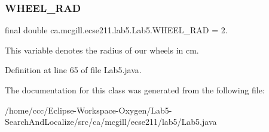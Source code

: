 \subsubsection{\texorpdfstring{W\+H\+E\+E\+L\+\_\+\+R\+AD}{WHEEL\_RAD}}
{\footnotesize\ttfamily final double ca.\+mcgill.\+ecse211.\+lab5.\+Lab5.\+W\+H\+E\+E\+L\+\_\+\+R\+AD = 2.\hspace{0.3cm}{\ttfamily [static]}}

This variable denotes the radius of our wheels in cm. 

Definition at line 65 of file Lab5.\+java.



The documentation for this class was generated from the following file\+:\begin{DoxyCompactItemize}
\item 
/home/ccc/\+Eclipse-\/\+Workspace-\/\+Oxygen/\+Lab5-\/\+Search\+And\+Localize/src/ca/mcgill/ecse211/lab5/Lab5.\+java\end{DoxyCompactItemize}
